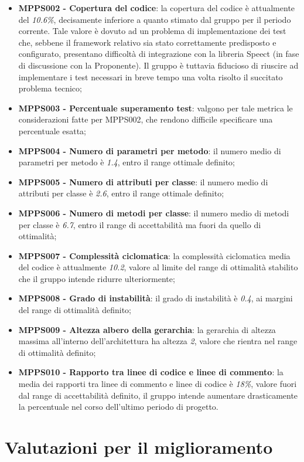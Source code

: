 \documentclass[openany,12pt,a4paper]{report}
\begin{document}
\begin{itemize}
	\item \textbf{MPPS002 - Copertura del codice}: la copertura del codice è attualmente del \textit{10.6\%}, decisamente inferiore a quanto stimato dal gruppo per il periodo corrente. Tale valore è dovuto ad un problema di implementazione dei test che, sebbene il framework relativo sia stato correttamente predisposto e configurato, presentano difficoltà di integrazione con la libreria Speect (in fase di discussione con la Proponente). Il gruppo è tuttavia fiducioso di riuscire ad implementare i test necessari in breve tempo una volta risolto il succitato problema tecnico;
	\item \textbf{MPPS003 - Percentuale superamento test}: valgono per tale metrica le considerazioni fatte per MPPS002, che rendono difficile specificare una percentuale esatta;
	\item \textbf{MPPS004 - Numero di parametri per metodo}: il numero medio di parametri per metodo è \textit{1.4}, entro il range ottimale definito;
	\item \textbf{MPPS005 - Numero di attributi per classe}: il numero medio di attributi per classe è \textit{2.6}, entro il range ottimale definito;
	\item \textbf{MPPS006 - Numero di metodi per classe}: il numero medio di metodi per classe è \textit{6.7}, entro il range di accettabilità ma fuori da quello di ottimalità;
	\item \textbf{MPPS007 - Complessità ciclomatica}: la complessità ciclomatica media del codice è attualmente \textit{10.2}, valore al limite del range di ottimalità stabilito che il gruppo intende ridurre ulteriormente;
	\item \textbf{MPPS008 - Grado di instabilità}: il grado di instabilità è \textit{0.4}, ai margini del range di ottimalità definito;
	\item \textbf{MPPS009 - Altezza albero della gerarchia}: la gerarchia di altezza massima all'interno dell'architettura ha altezza \textit{2}, valore che rientra nel range di ottimalità definito;
	\item \textbf{MPPS010 - Rapporto tra linee di codice e linee di commento}: la media dei rapporti tra linee di commento e linee di codice è \textit{18\%}, valore fuori dal range di accettabilità definito, il gruppo intende aumentare drasticamente la percentuale nel corso dell'ultimo periodo di progetto.
\end{itemize}

\chapter{Valutazioni per il miglioramento}
\end{document}
